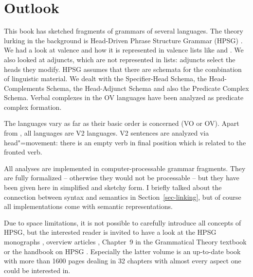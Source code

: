 
\chapter{Outlook}
\label{chap-outlook}

This book has sketched fragments of grammars of several  languages. The theory lurking in the
background is Head-Driven Phrase Structure Grammar (HPSG)\indexhpsg
\parencites{ps}{ps2}{MuellerLehrbuch3}{HPSGHandbook}. We had a look at valence and how it is
represented in valence lists like \spr and \comps. We also looked at adjuncts, which are not
represented in lists: adjuncts select the heads they modify. HPSG assumes that there are schemata
for the combination of linguistic material. We dealt with the Specifier-Head Schema, the
Head-Complements Schema, the Head-Adjunct Schema and also the Predicate Complex Schema. Verbal
complexes in the  OV languages have been analyzed as predicate complex formation.

The  languages vary as far as their basic order is concerned (VO or OV). Apart from ,
all  languages are V2 languages. V2 sentences are analyzed via head"=movement: there is an
empty verb in final position which is related to the fronted verb.

All analyses are implemented in computer-processable grammar fragments. They are fully formalized –
otherwise they would not be processable – but they have been given here in simplified and sketchy
form. I briefly talked about the connection between syntax and semantics in Section~\ref{sec-linking}, but of
course all implementations come with semantic representations.

Due to space limitations, it is not possible to carefully introduce all concepts of HPSG, but the
interested reader is invited to have a look at the HPSG monographs
\parencites{ps}{ps2}{GSag2000a-u}{MuellerLehrbuch3}, overview articles
\parencites{LM2006a}{PK2006a-u}{Bildhauer2014a-u}{MuellerHPSGHandbook,MuellerCurrentApproaches}, Chapter~9 in
the Grammatical Theory textbook \citep{MuellerGT-Eng5} or the handbook on HPSG
\citep{HPSGHandbook}. Especially the latter volume is an up-to-date book with more than 1600 pages
dealing in 32 chapters with almost every aspect one could be interested in.







